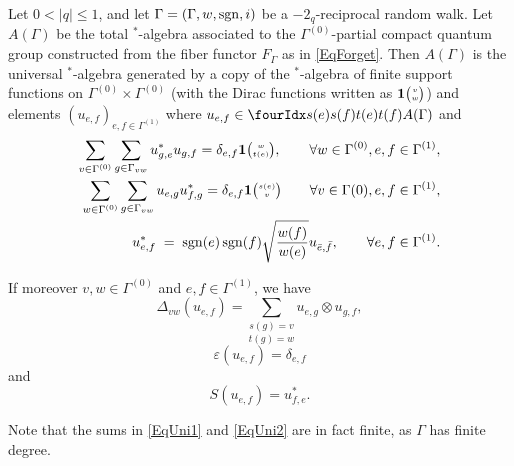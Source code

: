 \begin{Theorem}\label{TheoGenRel} Let $0<|q|\leq 1$, and let $\Gamma = (\Gamma,w,\operatorname{\mathrm{sgn}},i)$ be a $-2_q$-reciprocal random walk. Let $A(\Gamma)$ be the total $^*$-algebra associated to the $\Gamma^{(0)}$-partial compact quantum group constructed from the fiber functor $F_{\Gamma}$ as in \eqref{EqForget}. Then $A(\Gamma)$ is the universal $^*$-algebra generated by a copy of the $^*$-algebra of finite support functions on $\Gamma^{(0)}\times \Gamma^{(0)}$ (with the Dirac functions written as $\mathbf{1}{\tiny {\begin{pmatrix} v\\w\end{pmatrix}}}$) and elements $(u_{e,f})_{e,f\in \Gamma^{(1)}}$ where $u_{e,f}\in \Gr{A(\Gamma)}{s(e)}{t(e)}{s(f)}{t(f)}$ and 
\begin{eqnarray} 
\label{EqUni1}\sum_{v\in \Gamma^{(0)}}\sum_{g\in \Gamma_{vw}} u_{g,e}^*u_{g,f} = \delta_{e,f}\mathbf{1}{\tiny \begin{pmatrix} w \\ t(e)\end{pmatrix}}, \qquad \forall w\in \Gamma^{(0)}, e,f\in \Gamma^{(1)},\\
\label{EqUni2}\sum_{w\in \Gamma^{(0)}} \sum_{g\in \Gamma_{vw}} u_{e,g}u_{f,g}^* = \delta_{e,f} \mathbf{1}{\tiny \begin{pmatrix} s(e) \\ v\end{pmatrix}}\qquad \forall v\in \Gamma{(0)}, e,f\in \Gamma^{(1)},\\ 
\label{EqInt}u_{e,f}^* \;=\; \operatorname{\mathrm{sgn}}(e)\operatorname{\mathrm{sgn}}(f)\sqrt{\frac{w(f)}{w(e)}} u_{\bar{e},\bar{f}},\qquad \forall e,f\in \Gamma^{(1)}.
\end{eqnarray}

If moreover $v,w\in \Gamma^{(0)}$ and $e,f\in \Gamma^{(1)}$, we have \[\Delta_{vw}(u_{e,f}) = \underset{t(g) = w}{\sum_{s(g) = v}} u_{e,g}\otimes u_{g,f},\]
\[\varepsilon(u_{e,f}) = \delta_{e,f}\] and \[S(u_{e,f}) = u_{f,e}^*.\] 
\end{Theorem} 

Note that the sums in \eqref{EqUni1} and \eqref{EqUni2} are in fact finite, as $\Gamma$ has finite degree. 

